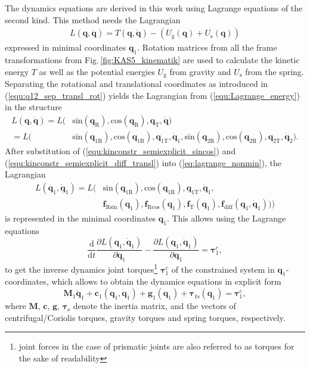 \documentclass{svproc}
\newcommand{\bm}[1]{\boldsymbol{#1}}
\begin{document}
The dynamics equations are derived in this work using Lagrange equations of the second kind. This method needs the Lagrangian 
%
\begin{align}
L(\bm{q},\dot{\bm{q}}) = T(\bm{q},\dot{\bm{q}})-(U_{\mathrm{g}}(\bm{q})+U_{\mathrm{s}}(\bm{q}))
\label{equ:Lagrange_energy}
\end{align}
%
expressed in minimal coordinates $\bm{q}_{1}$.
Rotation matrices from all the frame transformations from Fig.\,\ref{fig:KAS5_kinematik} are used to calculate the kinetic energy $T$ as well as the potential energies $U_{\mathrm{g}}$ from gravity and $U_{\mathrm{s}}$ from the spring.
Separating the rotational and translational coordinates as introduced in (\ref{equ:q12_sep_transl_rot}) yields the Lagrangian from (\ref{equ:Lagrange_energy}) in the structure
%
\begin{align}
L(\bm{q},\dot{\bm{q}}) =L( & \mathrm{sin}  (\bm{q}_{\mathrm{R}}),\mathrm{cos}(\bm{q}_{\mathrm{R}}), \bm{q}_{\mathrm{T}},\dot{\bm{q}}) \\\label{eq:lagrange_nonmin}
=L( & \mathrm{sin}  (\bm{q}_{1\mathrm{R}}),\mathrm{cos}(\bm{q}_{1\mathrm{R}}), \bm{q}_{1\mathrm{T}},\dot{\bm{q}}_{1}, \mathrm{sin}  (\bm{q}_{2\mathrm{R}}),\mathrm{cos}(\bm{q}_{2\mathrm{R}}), \bm{q}_{2\mathrm{T}},\dot{\bm{q}}_{2}).
\end{align}
%
After substitution of (\ref{equ:kinconstr_semiexplicit_sincos}) and (\ref{equ:kinconstr_semiexplicit_diff_transl}) into (\ref{eq:lagrange_nonmin}), the Lagrangian 
%
\begin{align}
L(\bm{q}_1,\dot{\bm{q}}_1)=L( & \mathrm{sin} (\bm{q}_{1\mathrm{R}}),\mathrm{cos}(\bm{q}_{1\mathrm{R}}), \bm{q}_{1\mathrm{T}},\dot{\bm{q}}_{1}, \\ &
\bm{f}_{\mathrm{R}\mathrm{sin}}(\bm{q}_1),
\bm{f}_{\mathrm{R}\mathrm{cos}}(\bm{q}_1),
\bm{f}_{\mathrm{T}}(\bm{q}_1),
\bm{f}_{\mathrm{diff}}(\bm{q}_1,\dot{\bm{q}}_1))) \nonumber
\end{align}
%
is represented in the minimal coordinates $\bm{q}_1$.
This allows using the Lagrange equations
%
\begin{equation}
\frac{\mathrm{d}}{{\mathrm{d}}t}\frac{\partial L(\bm{q}_1,\dot{\bm{q}}_1)}{\partial \dot{\bm{q}}_1} - \frac{\partial L(\bm{q}_1,\dot{\bm{q}}_1)}{\partial \bm{q}_1}= \bm{\tau}^c_1,
\end{equation}
%
to get the inverse dynamics joint torques\footnote{joint forces in the case of prismatic joints are also referred to as torques for the sake of readability} $\bm{\tau}^c_1$ of the constrained system in $\bm{q}_1$-coordinates, which allows to obtain the dynamics equations in explicit form
%
\begin{equation}
\bm{M}_1\ddot{\bm{q}}_1+\bm{c}_1(\bm{q}_1,\dot{\bm{q}}_1)+\bm{g}_1(\bm{q}_1) + \bm{\tau}_{1\mathrm{s}}(\bm{q}_1) = \bm{\tau}^c_1,
\label{equ:Dyn_MinKoord}
\end{equation}
%
where $\bm{M}$, $\bm{c}$, $\bm{g}$, $\bm{\tau}_{\mathrm{s}}$ denote the inertia matrix, and the vectors of centrifugal/Coriolis torques, gravity torques and spring torques, respectively.
\end{document}
